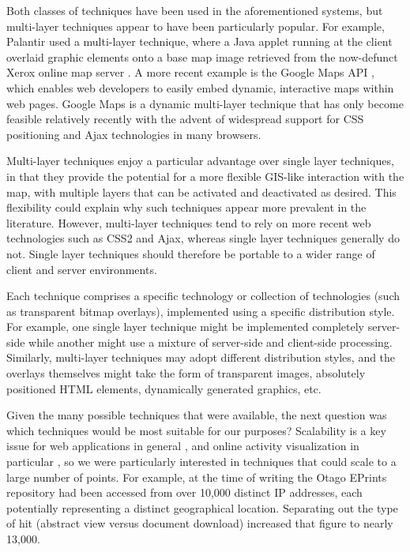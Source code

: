 \documentclass[acmtocl,acmnow]{acmtrans2m}
\begin{document}
Both classes of techniques have been used in the aforementioned systems,
but multi-layer techniques appear to have been particularly popular. For
example, Palantir used a multi-layer technique, where a Java applet running
at the client overlaid graphic elements onto a base map image retrieved
from the now-defunct Xerox online map server
\cite{Papa-N-1998-Palantir}. A more recent example is the Google Maps
API \cite{Goog-M-2006-maps}, which enables web developers to easily
embed dynamic, interactive maps within web pages. Google Maps is a
dynamic multi-layer technique that has only become feasible relatively
recently with the advent of widespread support for CSS positioning and
Ajax technologies in many browsers.

Multi-layer techniques enjoy a particular advantage over single layer
techniques, in that they provide the potential for a more flexible
GIS-like interaction with the map, with multiple layers that can be
activated and deactivated as desired. This flexibility could explain why
such techniques appear more prevalent in the literature. However,
multi-layer techniques tend to rely on more recent web technologies such as
CSS2 and Ajax, whereas single layer techniques generally do not. Single
layer techniques should therefore be portable to a wider range of client
and server environments.

Each technique comprises a specific technology or collection of
technologies (such as transparent bitmap overlays), implemented using a
specific distribution style. For example, one single layer technique
might be implemented completely server-side while another might use a
mixture of server-side and client-side processing. Similarly, multi-layer
techniques may adopt different distribution styles, and the overlays
themselves might take the form of transparent images, absolutely
positioned HTML elements, dynamically generated graphics, etc.

Given the many possible techniques that were available, the next
question was which techniques would be most suitable for our purposes?
Scalability is a key issue for web applications in general \cite[p.\
28]{Offu-J-2002-quality}, and online activity visualization in
particular \cite[p.\ 50]{Eick-SG-2001-sitevis}, so we were particularly
interested in techniques that could scale to a large number of points.
For example, at the time of writing the Otago EPrints repository had
been accessed from over 10,000 distinct IP addresses, each potentially
representing a distinct geographical location. Separating out the type
of hit (abstract view versus document download) increased that figure to
nearly 13,000.
\end{document}
